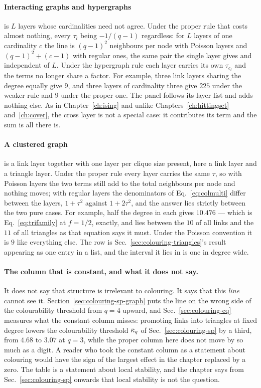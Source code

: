 \paragraph{Interacting graphs and hypergraphs} is $L$ layers whose
cardinalities need not agree. Under the proper rule that costs almost nothing,
every $\tau_{l}$ being $-1/(q-1)$ regardless: for $L$ layers of one cardinality
$c$ the line is $(q-1)^{2}$ neighbours per node with Poisson layers and
$(q-1)^{2}+(c-1)$ with regular ones, the same pair the single layer gives and
independent of $L$. Under the hypergraph rule each layer carries its own
$\tau_{c_{l}}$ and the terms no longer share a factor. For example, three link
layers sharing the degree equally give $9$, and three layers of cardinality
three give $225$ under the weaker rule and $9$ under the proper one. The panel
follows its layer list and adds nothing else. As in
Chapter~\ref{ch:ising} and unlike Chapters~\ref{ch:hittingset}
and~\ref{ch:cover}, the cross layer is not a special case: it contributes its
term and the sum is all there is.

\paragraph{A clustered graph} is a link layer together with one layer per clique
size present, here a link layer and a triangle layer. Under the proper rule
every layer carries the same $\tau$, so with Poisson
layers the two terms still add to the total neighbours per node and nothing
moves; with regular layers the denominators of Eq.~\eqref{eq:colmulti} differ
between the layers, $1+\tau^{2}$ against $1+2\tau^{2}$, and the answer lies
strictly between the two pure cases. For example, half the degree in each gives
$10.476$ --- which is Eq.~\eqref{eq:trifamily} at $f=1/2$, exactly, and lies
between the $10$ of all links and the $11$ of all triangles as that equation
says it must. Under the Poisson convention it is $9$ like everything else. The
row is Sec.~\ref{sec:colouring-triangles}'s result appearing as one entry in a
list, and the interval it lies in is one in degree wide.

\paragraph{The column that is constant, and what it does not say.} It does not
say that structure is irrelevant to colouring. It says that this
\emph{line} cannot see it. Section~\ref{sec:colouring-sp-graph} puts the
line on the wrong side of the colourability threshold from $q=4$ upward, and
Sec.~\ref{sec:colouring-cq} measures what the constant column misses: promoting
links into triangles at fixed degree lowers the colourability threshold
$\bar\kappa_{q}$ of Sec.~\ref{sec:colouring-sp} by a third, from $4.68$ to $3.07$ at
$q=3$, while the proper column here does not move by so much as a
digit. A reader who took the constant column as a statement about colouring
would have the sign of the largest effect in the chapter replaced by a zero.
The table is a statement about local stability, and the chapter says from
Sec.~\ref{sec:colouring-sp} onwards that local stability is not the
question.

